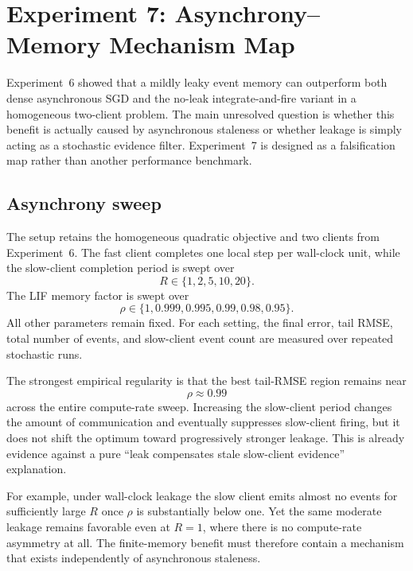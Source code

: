 \section{Experiment 7: Asynchrony--Memory Mechanism Map}
\label{sec:exp7}

Experiment~6 showed that a mildly leaky event memory can outperform both dense asynchronous SGD and the no-leak integrate-and-fire variant in a homogeneous two-client problem. The main unresolved question is whether this benefit is actually caused by asynchronous staleness or whether leakage is simply acting as a stochastic evidence filter. Experiment~7 is designed as a falsification map rather than another performance benchmark.

\subsection{Asynchrony sweep}

The setup retains the homogeneous quadratic objective and two clients from Experiment~6. The fast client completes one local step per wall-clock unit, while the slow-client completion period is swept over
\begin{equation}
  R\in\{1,2,5,10,20\}.
\end{equation}
The LIF memory factor is swept over
\begin{equation}
  \rho\in\{1,0.999,0.995,0.99,0.98,0.95\}.
\end{equation}
All other parameters remain fixed. For each setting, the final error, tail RMSE, total number of events, and slow-client event count are measured over repeated stochastic runs.

The strongest empirical regularity is that the best tail-RMSE region remains near
\begin{equation}
  \rho\approx0.99
\end{equation}
across the entire compute-rate sweep. Increasing the slow-client period changes the amount of communication and eventually suppresses slow-client firing, but it does not shift the optimum toward progressively stronger leakage. This is already evidence against a pure ``leak compensates stale slow-client evidence'' explanation.

For example, under wall-clock leakage the slow client emits almost no events for sufficiently large $R$ once $\rho$ is substantially below one. Yet the same moderate leakage remains favorable even at $R=1$, where there is no compute-rate asymmetry at all. The finite-memory benefit must therefore contain a mechanism that exists independently of asynchronous staleness.

